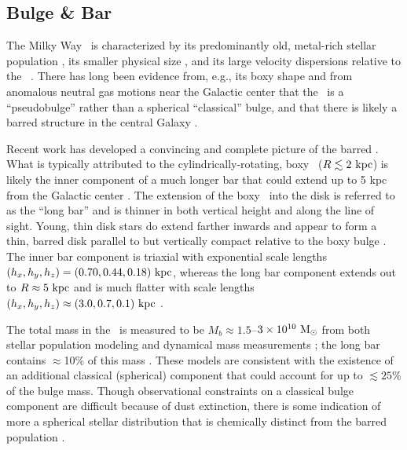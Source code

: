 \subsection{Bulge \& Bar}

The Milky Way \mwbulge\ is characterized by its predominantly old, metal-rich
stellar population \citep[$t_{\rm age} \gtrsim 10~{\rm Gyr}$, $\feh \gtrsim
-1$;][]{zoccali03}, its smaller physical size \citep[$R \lesssim
1$--$2~\kpc$;][]{binney97}, and its large velocity dispersions relative to the
\mwdisk\ \citep[$\sigma_v \sim 100~\kms$;][]{ness13b}. There has long been
evidence from, e.g., its boxy shape and from anomalous neutral gas motions near
the Galactic center that the \mwbulge\ is a ``pseudobulge'' rather than a
spherical ``classical'' bulge, and that there is likely a barred structure in
the central Galaxy \citep{blitz91, binney91, weiland94, binney97}.

Recent work has developed a convincing and complete picture of the barred
\mwbulge. What is typically attributed to the cylindrically-rotating, boxy
\mwbulge\ ($R \lesssim 2~\mathrm{kpc}$) is likely the inner component of a much longer
bar that could extend up to 5 kpc from the Galactic center \citep{wegg13,
wegg15}. The extension of the boxy \mwbulge\ into the disk is referred to as the
``long bar'' and is thinner in both vertical height and along the line of sight.
Young, thin disk stars do extend farther inwards and appear to form a thin,
barred disk parallel to but vertically compact relative to the boxy bulge
\citep{dekany15}. The inner bar component is triaxial with exponential scale
lengths $(h_x, h_y, h_z) = (0.70, 0.44, 0.18)~\mathrm{kpc}$, whereas the long bar
component extends out to $R\approx 5~\mathrm{kpc}$ and is much flatter with scale
lengths $(h_x, h_y, h_z) \approx (3.0, 0.7, 0.1)~\mathrm{kpc}$ \citep{wegg15}.


The total mass in the \mwbulge\ is measured to be $M_b \approx 1.5$--$3 \times
10^{10}~\mathrm{M}_\odot$ from both stellar population modeling \citep{dwek95, valenti15}
and dynamical mass measurements \citep{zhao95, portail15}; the long bar contains
$\approx$10\% of this mass \citep{wegg15}. These models are consistent with the
existence of an additional classical (spherical) component that could account
for up to $\lesssim 25\%$ of the bulge mass. Though observational constraints on
a classical bulge component are difficult because of dust extinction, there is
some indication of more a spherical stellar distribution that is chemically
distinct from the barred population \citep{ness13a,ness13b}.

